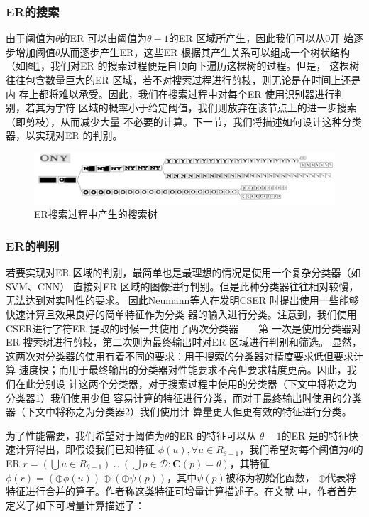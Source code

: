 \subsubsection{ER的搜索}

由于阈值为$\theta$的ER 可以由阈值为$\theta-1$的ER 区域所产生，因此我们可以从0开
始逐步增加阈值$\theta$从而逐步产生ER，这些ER 根据其产生关系可以组成一个树状结构
（如图\ref{Fig:ERTree}，我们对ER 的搜索过程便是自顶向下遍历这棵树的过程。但是，
这棵树往往包含数量巨大的ER 区域，若不对搜索过程进行剪枝，则无论是在时间上还是内
存上都将难以承受。因此，我们在搜索过程中对每个ER 使用识别器进行判别，若其为字符
区域的概率小于给定阈值，我们则放弃在该节点上的进一步搜索（即剪枝），从而减少大量
不必要的计算。下一节，我们将描述如何设计这种分类器，以实现对ER 的判别。

\begin{figure}[ht]
  \centering
  \includegraphics[width=0.8\linewidth]{./Figure/ERTree.png}
  \caption{ER搜索过程中产生的搜索树}\label{Fig:ERTree}
\end{figure}

\subsubsection{ER的判别}

若要实现对ER 区域的判别，最简单也是最理想的情况是使用一个复杂分类器（如SVM、CNN）
直接对ER 区域的图像进行判别。但是此种分类器往往相对较慢，无法达到对实时性的要求。
因此Neumann等人在发明CSER 时提出使用一些能够快速计算且效果良好的简单特征作为分类
器的输入进行分类。注意到，我们使用CSER进行字符ER 提取的时候一共使用了两次分类器——第
一次是使用分类器对ER 搜索树进行剪枝，第二次则为最终输出时对ER 区域进行判别和筛选。
显然，这两次对分类器的使用有着不同的要求：用于搜索的分类器对精度要求低但要求计算
速度快；而用于最终输出的分类器对性能要求不高但要求精度更高。因此，我们在此分别设
计这两个分类器，对于搜索过程中使用的分类器（下文中将称之为分类器1）我们使用少但
容易计算的特征进行分类，而对于最终输出时使用的分类器（下文中将称之为分类器2）我们使用计
算量更大但更有效的特征进行分类。

为了性能需要，我们希望对于阈值为$\theta$的ER 的特征可以从
$\theta-1$的ER 是的特征快速计算得出，即假设我们已知特征 $\phi(u), \forall{u \in
  R_{\theta-1}}$，我们希望对每个阈值为$\theta$的ER $r = \left(
  \bigcup{u \in R_{\theta-1}} \right) \cup \left( \bigcup{p \in \mathcal{D}} :
  \mathbf{C}(p) = \theta \right)$，其特征$\phi(r) = \left( \oplus{\phi(u)}
\right) \oplus \left( \oplus{\psi(p)} \right)$，其中$\psi(p)$被称为初始化函数，
$\oplus$代表将特征进行合并的算子。作者称这类特征可增量计算描述子。在文献
\cite{Neumann:2012ik}中，作者首先定义了如下可增量计算描述子：

